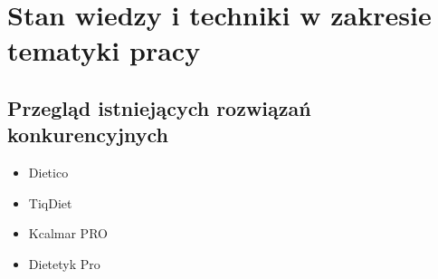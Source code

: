 \chapter{Stan wiedzy i techniki w zakresie tematyki pracy}\label{ch:knowladge-state}
\section{Przegląd istniejących rozwiązań konkurencyjnych}\label{sec:competitive-solutions}
\begin{itemize}
    \item Dietico
    \item TiqDiet
    \item Kcalmar PRO
    \item Dietetyk Pro
\end{itemize}


